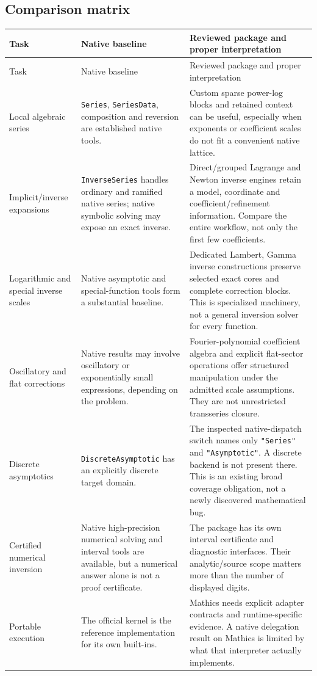 \documentclass[11pt,letterpaper]{article}
\newcommand{\code}[1]{\nolinkurl{#1}}
\begin{document}
\subsection{Comparison matrix}
\small
\begin{longtable}{P{0.21\textwidth}P{0.34\textwidth}P{0.36\textwidth}}
\toprule
Task & Native baseline & Reviewed package and proper interpretation\\
\midrule
\endfirsthead
\toprule Task & Native baseline & Reviewed package and proper interpretation\\\midrule
\endhead
Local algebraic series & \code{Series}, \code{SeriesData}, composition and reversion are established native tools. & Custom sparse power-log blocks and retained context can be useful, especially when exponents or coefficient scales do not fit a convenient native lattice.\\
Implicit/inverse expansions & \code{InverseSeries} handles ordinary and ramified native series; native symbolic solving may expose an exact inverse. & Direct/grouped Lagrange and Newton inverse engines retain a model, coordinate and coefficient/refinement information. Compare the entire workflow, not only the first few coefficients.\\
Logarithmic and special inverse scales & Native asymptotic and special-function tools form a substantial baseline. & Dedicated Lambert, Gamma inverse constructions preserve selected exact cores and complete correction blocks. This is specialized machinery, not a general inversion solver for every function.\\
Oscillatory and flat corrections & Native results may involve oscillatory or exponentially small expressions, depending on the problem. & Fourier-polynomial coefficient algebra and explicit flat-sector operations offer structured manipulation under the admitted scale assumptions. They are not unrestricted transseries closure.\\
Discrete asymptotics & \code{DiscreteAsymptotic} has an explicitly discrete target domain. & The inspected native-dispatch switch names only \code{"Series"} and \code{"Asymptotic"}. A discrete backend is not present there. This is an existing broad coverage obligation, not a newly discovered mathematical bug.\\
Certified numerical inversion & Native high-precision numerical solving and interval tools are available, but a numerical answer alone is not a proof certificate. & The package has its own interval certificate and diagnostic interfaces. Their analytic/source scope matters more than the number of displayed digits.\\
Portable execution & The official kernel is the reference implementation for its own built-ins. & Mathics needs explicit adapter contracts and runtime-specific evidence. A native delegation result on Mathics is limited by what that interpreter actually implements.\\
\bottomrule
\end{longtable}
\end{document}
